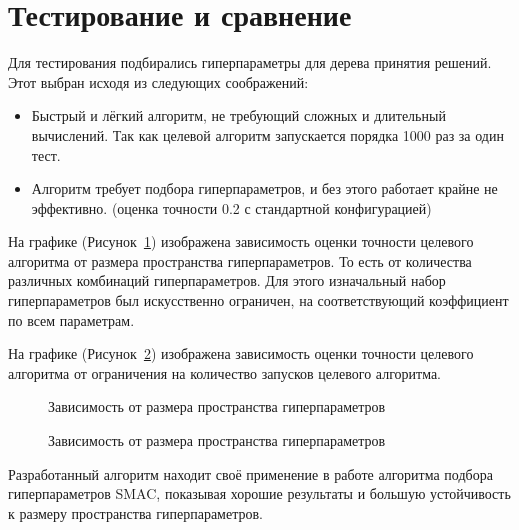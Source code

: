 \section{Тестирование и сравнение}

Для тестирования подбирались гиперпараметры для дерева принятия решений. Этот
выбран исходя из следующих соображений:

\begin{itemize}
    \item Быстрый и лёгкий алгоритм, не требующий сложных и длительный вычислений.
    Так как целевой алгоритм запускается порядка 1000 раз за один тест.
    \item Алгоритм требует подбора гиперпараметров, и без этого работает крайне не
    эффективно. (оценка точности 0.2 с стандартной конфигурацией)
\end{itemize}

На графике (Рисунок~\ref{smac_size}) изображена зависимость оценки точности
целевого алгоритма от размера пространства гиперпараметров. То есть от
количества различных комбинаций гиперпараметров. Для этого изначальный набор
гиперпараметров был искусственно ограничен, на соответствующий коэффициент по
всем параметрам.

На графике (Рисунок~\ref{smac_count}) изображена зависимость оценки точности
целевого алгоритма от ограничения на количество запусков целевого алгоритма.

\begin{center}
\begin{figure}[!ht]
\caption{Зависимость от размера пространства гиперпараметров}\label{smac_size}
\end{figure}
\begin{figure}[!ht]
\caption{Зависимость от размера пространства гиперпараметров}\label{smac_count}
\end{figure}
\end{center}

\chapterconclusion{}

Разработанный алгоритм находит своё применение в работе алгоритма подбора
гиперпараметров SMAC, показывая хорошие результаты и большую устойчивость
к размеру пространства гиперпараметров.
